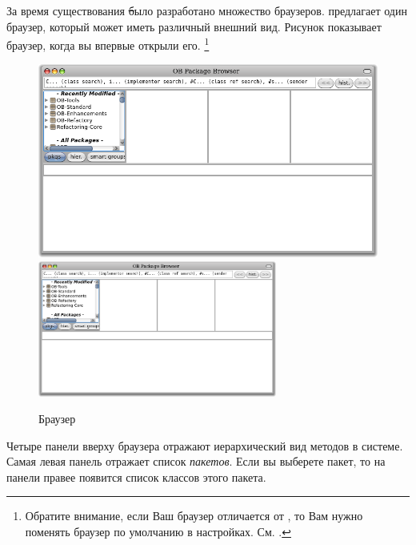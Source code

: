 \documentclass[a4paper,10pt,twoside]{book}
\begin{document}
За время существования \st было разработано множество браузеров.
\pharo предлагает один браузер, который может иметь различный внешний вид.
Рисунок  показывает браузер, когда вы впервые открыли его. \footnote{Обратите внимание, если Ваш браузер отличается от  , то Вам нужно поменять браузер по умолчанию в настройках.  См. .}

\begin{figure}[htbp]
   \centering
   \ifluluelse
	 {\includegraphics[width=\textwidth]{SystemBrowser0} }
	 {\includegraphics[width=0.7\textwidth]{SystemBrowser0} }
   \caption{Браузер}
\end{figure}


Четыре панели вверху браузера отражают иерархический вид методов в системе.
Самая левая панель отражает список \emph{пакетов}. Если вы выберете пакет, то на панели правее появится список классов этого пакета. 
\end{document}

